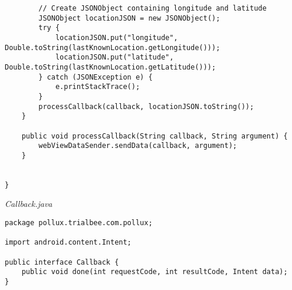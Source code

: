 \begin{lstlisting}
        // Create JSONObject containing longitude and latitude
        JSONObject locationJSON = new JSONObject();
        try {
            locationJSON.put("longitude", Double.toString(lastKnownLocation.getLongitude()));
            locationJSON.put("latitude", Double.toString(lastKnownLocation.getLatitude()));
        } catch (JSONException e) {
            e.printStackTrace();
        }
        processCallback(callback, locationJSON.toString());
    }

    public void processCallback(String callback, String argument) {
        webViewDataSender.sendData(callback, argument);
    }


}
\end{lstlisting}
\emph{Callback.java}
\begin{lstlisting}
package pollux.trialbee.com.pollux;

import android.content.Intent;

public interface Callback {
    public void done(int requestCode, int resultCode, Intent data);
}
\end{lstlisting}

